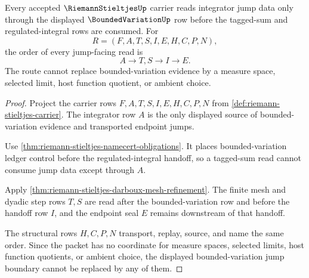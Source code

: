 \begin{theorem}
\label{thm:riemann-stieltjes-bounded-variation-jump-boundary}
Every accepted $\RiemannStieltjesUp$ carrier reads integrator jump data only through the displayed $\BoundedVariationUp$ row before the tagged-sum and regulated-integral rows are consumed. For
$$
R=(F,A,T,S,I,E,H,C,P,N),
$$
the order of every jump-facing read is
$$
A \longrightarrow T,S \longrightarrow I \longrightarrow E .
$$
The route cannot replace bounded-variation evidence by a measure space, selected limit, host function quotient, or ambient choice.
\end{theorem}
\begin{proof}
Project the carrier rows $F,A,T,S,I,E,H,C,P,N$ from \autoref{def:riemann-stieltjes-carrier}. The integrator row $A$ is the only displayed source of bounded-variation evidence and transported endpoint jumps.

Use \autoref{thm:riemann-stieltjes-namecert-obligations}. It places bounded-variation ledger control before the regulated-integral handoff, so a tagged-sum read cannot consume jump data except through $A$.

Apply \autoref{thm:riemann-stieltjes-darboux-mesh-refinement}. The finite mesh and dyadic step rows $T,S$ are read after the bounded-variation row and before the handoff row $I$, and the endpoint seal $E$ remains downstream of that handoff.

The structural rows $H,C,P,N$ transport, replay, source, and name the same order. Since the packet has no coordinate for measure spaces, selected limits, host function quotients, or ambient choice, the displayed bounded-variation jump boundary cannot be replaced by any of them.
\end{proof}

